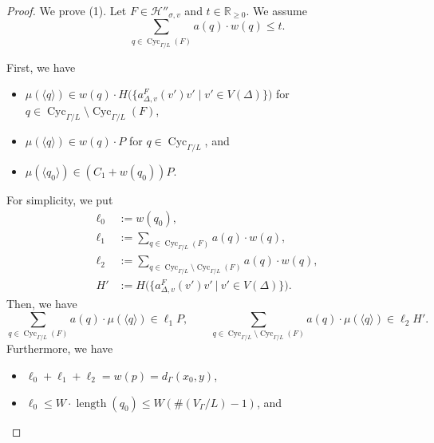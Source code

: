 \documentclass[11pt]{article}
\theoremstyle{definition}
\numberwithin{equation}{section}
\begin{document}
\begin{proof}
We prove (1). 
Let $F \in \mathcal{H}'' _{\sigma, v}$ and $t \in \mathbb{R}_{\ge 0}$. 
We assume 
\[
\sum _{q \in \operatorname{Cyc}_{\Gamma /L}(F)} a(q) \cdot w(q) \le t. 
\]

First, we have
\begin{itemize}
\item 
$\mu(\langle q \rangle) \in w(q) \cdot
H \bigl( \bigl \{ a^{F} _{\Delta, v} (v') v' \mid v' \in V(\Delta) \bigr \} \bigr)$ 
for $q \in \operatorname{Cyc}_{\Gamma /L} \setminus \operatorname{Cyc}_{\Gamma /L}(F)$, 

\item 
$\mu(\langle q \rangle) \in w(q) \cdot P$ for 
$q \in \operatorname{Cyc}_{\Gamma /L}$, and 

\item 
$\mu(\langle q_0 \rangle) \in (C_1 + w(q_0)) P$. 
\end{itemize}
For simplicity, we put 
\begin{align*}
\ell _0 &:= w(q_0), \\
\ell _1 &:= \sum _{q \in \operatorname{Cyc}_{\Gamma /L}(F)} a(q) \cdot w(q), \\
\ell _2 &:= \sum _{q \in \operatorname{Cyc}_{\Gamma /L} \setminus \operatorname{Cyc}_{\Gamma /L}(F)} 
a(q) \cdot w(q), \\
H' &:= H \bigl( \bigl \{ a^{F} _{\Delta, v} (v') v' \ \big | \ v' \in V(\Delta) \bigr \} \bigr). 
\end{align*}
Then, we have 
\[
\sum _{q \in \operatorname{Cyc}_{\Gamma /L}(F)} a(q) \cdot \mu(\langle q \rangle) 
\in \ell _1 P, \qquad
\sum _{q \in \operatorname{Cyc}_{\Gamma /L} \setminus \operatorname{Cyc}_{\Gamma /L}(F)} a(q) \cdot \mu(\langle q \rangle) 
\in \ell _2 H'. 
\]
Furthermore, we have
\begin{itemize}
\item
$\ell _0 + \ell _1 + \ell _2 = w(p) = d_{\Gamma}(x_0, y)$, 

\item
$\ell _0 \le W \cdot \operatorname{length}(q_0)  \le W(\#(V_{\Gamma}/L) -1)$, and


\end{itemize}
\end{proof}
\end{document}

